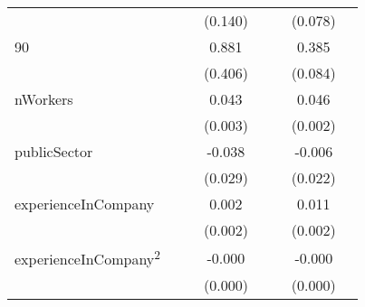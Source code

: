 \begin{longtable}{l*{3}{c}|l*{3}{c}}
	&                     &                     &     (0.140)         &                     &                     &     (0.078)         \\
	90                  &                     &                     &       0.881\sym{**} &                     &                     &       0.385\sym{***}\\
	&                     &                     &     (0.406)         &                     &                     &     (0.084)         \\
	nWorkers            &                     &                     &       0.043\sym{***}&                     &                     &       0.046\sym{***}\\
	&                     &                     &     (0.003)         &                     &                     &     (0.002)         \\
	publicSector      &                     &                     &      -0.038         &                     &                     &      -0.006         \\
	&                     &                     &     (0.029)         &                     &                     &     (0.022)         \\
	experienceInCompany &                     &                     &       0.002         &                     &                     &       0.011\sym{***}\\
	&                     &                     &     (0.002)         &                     &                     &     (0.002)         \\
	experienceInCompany\textsuperscript{2} &                     &                     &      -0.000         &                     &                     &      -0.000\sym{***}\\
	&                     &                     &     (0.000)         &                     &                     &     (0.000)         \\


\end{longtable}
